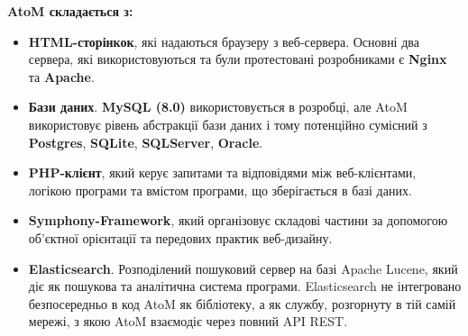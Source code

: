 \documentclass[14pt,a4paper]{article}
\begin{document}
\begin{large}
	\newpage
	
\textbf{AtoM складається з:} 
	
\begin{itemize}
  \item \textbf{HTML-сторінкок}, які надаються браузеру з веб-сервера. Основні два сервера, які використовуються та були протестовані розробниками є \textbf{Nginx} та \textbf{Apache}. 
  \item \textbf{Бази даних}. \textbf{MySQL (8.0)} використовується в розробці, але AtoM використовує рівень абстракції бази даних і тому потенційно сумісний з \textbf{Postgres}, \textbf{SQLite}, \textbf{SQLServer}, \textbf{Oracle}.
  
  \item \textbf{PHP-клієнт}, який керує запитами та відповідями між веб-клієнтами, логікою програми та вмістом програми, що зберігається в базі даних.
  
	\item \textbf{Symphony-Framework}, який організовує складові частини за допомогою об’єктної орієнтації та передових практик веб-дизайну.
	
	\item \textbf{Elasticsearch}. Розподілений пошуковий сервер на базі Apache Lucene, який діє як пошукова та аналітична система програми. Elasticsearch не інтегровано безпосередньо в код AtoM як бібліотеку, а як службу, розгорнуту в тій самій мережі, з якою AtoM взаємодіє через повний API REST.

\end{itemize}	

\end{large}
\end{document}
